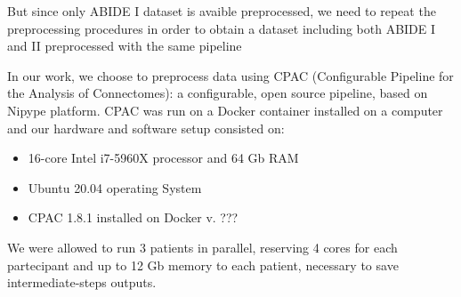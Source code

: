 \documentclass[a4paper,11pt]{article}
\begin{document}
But since only ABIDE I dataset is avaible preprocessed, we need to repeat the preprocessing procedures in order to obtain a dataset including both ABIDE I and II preprocessed with the same pipeline

In our work, we choose to preprocess data using CPAC (Configurable Pipeline for the Analysis of Connectomes): a configurable, open source pipeline, based on Nipype platform.
CPAC was run on a Docker container installed on a computer and our hardware and software setup consisted on:
\begin{itemize}
\item 16-core Intel i7-5960X processor and 64 Gb RAM
\item Ubuntu 20.04 operating System
\item CPAC 1.8.1 installed on Docker v. ???
\end{itemize}

We were allowed to run 3 patients in parallel, reserving 4 cores for each partecipant and up to 12 Gb memory to each patient, necessary to save intermediate-steps outputs.
\end{document}
